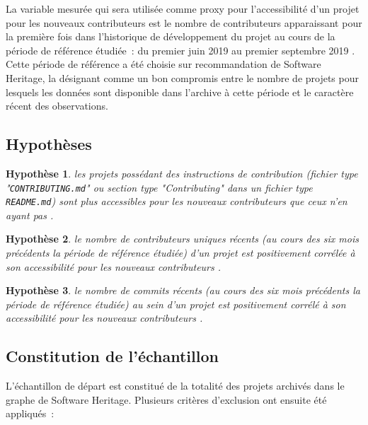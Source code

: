 \documentclass[dvipsnames]{llncs}
\newcommand{\en}[1]{\foreignlanguage{english}{\emph{#1}}}
\newtheorem{hypo}{Hypothèse}[theorem]
\begin{document}
    La variable mesurée qui sera utilisée comme proxy pour l'accessibilité d'un projet pour les nouveaux
    contributeurs est le nombre de contributeurs apparaissant pour la première fois dans l'historique de
    développement du projet au cours de la période de référence étudiée : du premier juin 2019 au premier
    septembre 2019 \parencite[voir section \ref{sec:accessibility-measure}, ainsi
    que][p.~13,16]{signals-2019}. Cette période de référence a été choisie sur recommandation de Software
    Heritage, la désignant comme un bon compromis entre le nombre de projets pour lesquels les données sont
    disponible dans l'archive à cette période et le caractère récent des observations.

    \subsection{Hypothèses}

    \newcommand{\newhyp}[2]{%
        \begin{hypo}
            \label{hyp:#1}#2
        \end{hypo}%
    }

    \newhyp{contributionguidelines}{%
        les projets possédant des instructions de contribution (fichier type "\texttt{CONTRIBUTING.md}" ou
        section type "\en{Contributing}" dans un fichier type \texttt{README.md}) sont plus accessibles pour
        les nouveaux contributeurs que ceux n'en ayant pas \parencite[voir][p.~11]{signals-2019}.%
    }

    \newhyp{recentcontributorcount}{%
        le nombre de contributeurs uniques récents (au cours des six mois précédents la période de référence
        étudiée) d'un projet est positivement corrélée à son accessibilité pour les nouveaux contributeurs
        \parencite[voir][p.~12-13,16]{signals-2019}.%
    }

    \newhyp{recentcommitcount}{%
        le nombre de \en{commits} récents (au cours des six mois précédents la période de référence étudiée)
        au sein d'un projet est positivement corrélé à son accessibilité pour les nouveaux contributeurs
        \parencite[voir][p.~13,16]{signals-2019}.
    }

    \subsection{Constitution de l'échantillon}
    \label{sec:constitution_echantillon}

    L'échantillon de départ est constitué de la totalité des projets archivés dans le graphe de Software
    Heritage. Plusieurs critères d'exclusion ont ensuite été appliqués :
\end{document}
